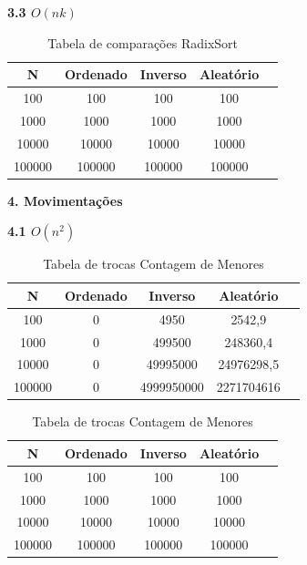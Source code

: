 \documentclass[10pt]{article}
\begin{document}
\vspace{0.5cm}

\textbf{3.3 $O(n k)$}

\begin{table}[H]
  \centering
  \caption{Tabela de comparações RadixSort}
  \begin{tabular}{|c|c|c|c|c|}
  \hline
  N & Ordenado & Inverso & Aleatório \\ \hline
  100 & 100 & 100 & 100 \\ \hline
  1000 & 1000 & 1000 & 1000 \\ \hline
  10000 & 10000 & 10000 & 10000 \\ \hline
  100000 & 100000 & 100000 & 100000 \\ \hline
  \end{tabular}
\end{table}

\vspace{0.25cm}

\textbf{4. Movimentações}

\vspace{0.5cm}

\textbf{4.1 $O(n^2)$}

\begin{table}[H]
  \parbox{.45\linewidth}{
    \centering
    \caption{Tabela de trocas BubbleSort}
    \begin{tabular}{|c|c|c|c|c|}
    \hline
    N & Ordenado & Inverso & Aleatório \\ \hline
    100 & 0 & 4950 & 2542,9 \\ \hline
    1000 & 0 & 499500 & 248360,4 \\ \hline
    10000 & 0 & 49995000 & 24976298,5 \\ \hline
    100000 & 0 & 4999950000 & 2271704616 \\ \hline
    \end{tabular}
  }
  \hfill
  \parbox{.45\linewidth}{
    \centering
    \caption{Tabela de trocas Contagem de Menores}
    \begin{tabular}{|c|c|c|c|c|}
    \hline
    N & Ordenado & Inverso & Aleatório \\ \hline
    100 & 100 & 100 & 100 \\ \hline
    1000 & 1000 & 1000 & 1000 \\ \hline
    10000 & 10000 & 10000 & 10000 \\ \hline
    100000 & 100000 & 100000 & 100000 \\ \hline
    \end{tabular}
  }
\end{table}
\end{document}
